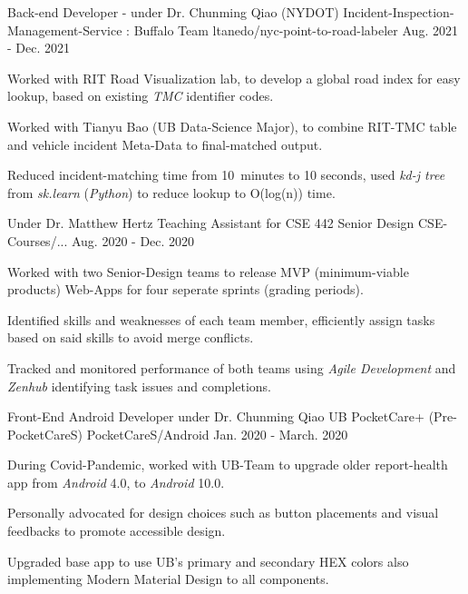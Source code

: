 \begin{cventries}
  \cventry
  {Back-end Developer - under Dr. Chunming Qiao} %
  {(NYDOT) Incident-Inspection-Management-Service : Buffalo Team} %
  { ltanedo/nyc-point-to-road-labeler } %
  {Aug. 2021 - Dec. 2021} %
  {
    \begin{cvitems} %
      \item { Worked with RIT Road Visualization lab, to develop a global road index for easy lookup, based on existing \textit{TMC} identifier codes. }
      \item { Worked with Tianyu Bao (UB Data-Science Major), to combine RIT-TMC table and vehicle incident Meta-Data to final-matched output. }
      \item { Reduced incident-matching time from 10~minutes to 10 seconds, used \textit{kd-j tree} from \textit{sk.learn} (\textit{Python}) to reduce lookup to O(log(n)) time.}
    \end{cvitems}
  }

  \cventry
  { Under Dr. Matthew Hertz } %
  { Teaching Assistant for CSE 442 Senior Design } %
  { CSE-Courses/... } %
  { Aug. 2020 - Dec. 2020 } %
  {
    \begin{cvitems} %
      \item { Worked with two Senior-Design teams to release MVP (minimum-viable products) Web-Apps for four seperate sprints (grading periods). }
      \item { Identified skills and weaknesses of each team member, efficiently assign tasks based on said skills to avoid merge conflicts.}
      \item { Tracked and monitored performance of both teams using \textit{Agile Development} and \textit{Zenhub} identifying task issues and completions.}
    \end{cvitems}
  }

  \cventry
  { Front-End Android Developer under Dr. Chunming Qiao} %
  { UB PocketCare+ (Pre-PocketCareS) } %
  { PocketCareS/Android } %
  { Jan. 2020 - March. 2020 } %
  {
    \begin{cvitems} %
      \item { During Covid-Pandemic, worked with UB-Team to upgrade older report-health app from \textit{Android} 4.0, to \textit{Android} 10.0.}
      \item { Personally advocated for design choices such as button placements and visual feedbacks to promote accessible design. }
      \item { Upgraded base app to use UB's primary and secondary HEX colors also implementing Modern Material Design to all components.}
    \end{cvitems}
  }


\end{cventries}
